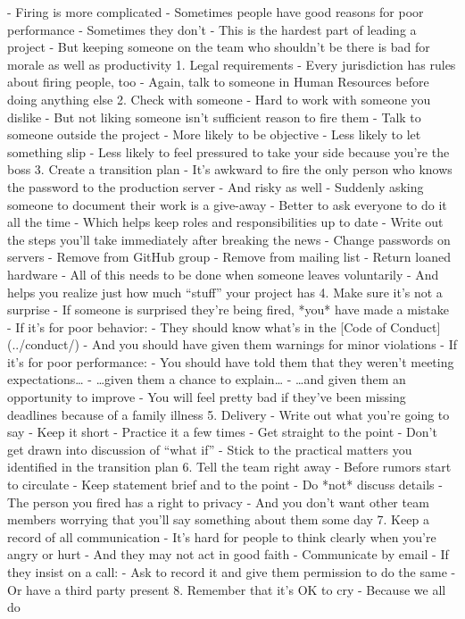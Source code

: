 \documentclass[10pt,letterpaper]{article}
\begin{document}
- Firing is more complicated
  - Sometimes people have good reasons for poor performance
  - Sometimes they don't
  - This is the hardest part of leading a project
  - But keeping someone on the team who shouldn't be there is bad for morale as well as productivity
1. Legal requirements
   - Every jurisdiction has rules about firing people, too
   - Again, talk to someone in Human Resources before doing anything else
2. Check with someone
   - Hard to work with someone you dislike
     - But not liking someone isn't sufficient reason to fire them
   - Talk to someone outside the project
     - More likely to be objective
     - Less likely to let something slip
     - Less likely to feel pressured to take your side because you're the boss
3. Create a transition plan
   - It's awkward to fire the only person who knows the password to the production server
     - And risky as well
   - Suddenly asking someone to document their work is a give-away
   - Better to ask everyone to do it all the time
     - Which helps keep roles and responsibilities up to date
   - Write out the steps you'll take immediately after breaking the news
     - Change passwords on servers
     - Remove from GitHub group
     - Remove from mailing list
     - Return loaned hardware
   - All of this needs to be done when someone leaves voluntarily
     - And helps you realize just how much ``stuff'' your project has
4. Make sure it's not a surprise
   - If someone is surprised they're being fired, *you* have made a mistake
   - If it's for poor behavior:
     - They should know what's in the [Code of Conduct](../conduct/)
     - And you should have given them warnings for minor violations
   - If it's for poor performance:
     - You should have told them that they weren't meeting expectations{\ldots}
     - {\ldots}given them a chance to explain{\ldots}
     - {\ldots}and given them an opportunity to improve
   - You will feel pretty bad if they've been missing deadlines because of a family illness
5. Delivery
   - Write out what you're going to say
   - Keep it short
   - Practice it a few times
   - Get straight to the point
   - Don't get drawn into discussion of ``what if''
   - Stick to the practical matters you identified in the transition plan
6. Tell the team right away
   - Before rumors start to circulate
   - Keep statement brief and to the point
   - Do *not* discuss details
     - The person you fired has a right to privacy
     - And you don't want other team members worrying that you'll say something about them some day
7. Keep a record of all communication
   - It's hard for people to think clearly when you're angry or hurt
     - And they may not act in good faith
   - Communicate by email
   - If they insist on a call:
     - Ask to record it and give them permission to do the same
     - Or have a third party present
8. Remember that it's OK to cry
   - Because we all do
\end{document}
